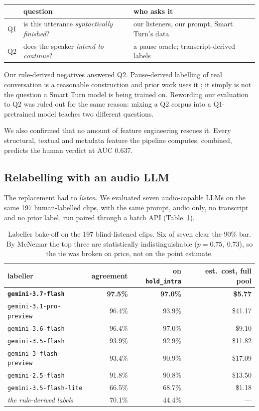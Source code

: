 \documentclass[11pt]{article}
\newcommand{\pct}{\%}
\begin{document}
\begin{center}
\small
\begin{tabular}{lll}
\toprule
& question & who asks it \\
\midrule
Q1 & is this utterance \emph{syntactically finished}? & our listeners, our prompt, Smart Turn's data \\
Q2 & does the speaker \emph{intend to continue}? & a pause oracle; transcript-derived labels \\
\bottomrule
\end{tabular}
\end{center}

Our rule-derived negatives answered Q2. Pause-derived labelling of real
conversation is a reasonable construction and prior work uses it
\cite{etd}; it simply is not the question a Smart Turn model is being
trained on. Rewording our evaluation to Q2 was ruled out for the same reason:
mixing a Q2 corpus into a Q1-pretrained model teaches two different questions.

We also confirmed that no amount of feature engineering rescues it. Every
structural, textual and metadata feature the pipeline computes, combined,
predicts the human verdict at AUC 0.637.

\subsection{Relabelling with an audio LLM}

The replacement had to \emph{listen}. We evaluated seven audio-capable LLMs on
the same 197 human-labelled clips, with the same prompt, audio only, no
transcript and no prior label, run paired through a batch API
(Table~\ref{tab:bakeoff}).

\begin{table}[t]
\centering\small
\begin{tabular}{lrrr}
\toprule
labeller & agreement & on \texttt{hold\_intra} & est.\ cost, full pool \\
\midrule
\textbf{\texttt{gemini-3.7-flash}} & \textbf{97.5\pct} & \textbf{97.0\pct} & \textbf{\$5.77} \\
\texttt{gemini-3.1-pro-preview} & 96.4\pct & 93.9\pct & \$41.17 \\
\texttt{gemini-3.6-flash} & 96.4\pct & 97.0\pct & \$9.10 \\
\texttt{gemini-3.5-flash} & 93.9\pct & 92.9\pct & \$11.82 \\
\texttt{gemini-3-flash-preview} & 93.4\pct & 90.9\pct & \$17.09 \\
\texttt{gemini-2.5-flash} & 91.8\pct & 90.8\pct & \$13.50 \\
\texttt{gemini-3.5-flash-lite} & 66.5\pct & 68.7\pct & \$1.18 \\
\midrule
\emph{the rule-derived labels} & 70.1\pct & 44.4\pct & --- \\
\bottomrule
\end{tabular}
\caption{Labeller bake-off on the 197 blind-listened clips. Six of seven clear
the 90\pct{} bar. By McNemar the top three are statistically indistinguishable
($p=0.75,\ 0.73$), so the tie was broken on price, not on the point estimate.}
\label{tab:bakeoff}
\end{table}
\end{document}
